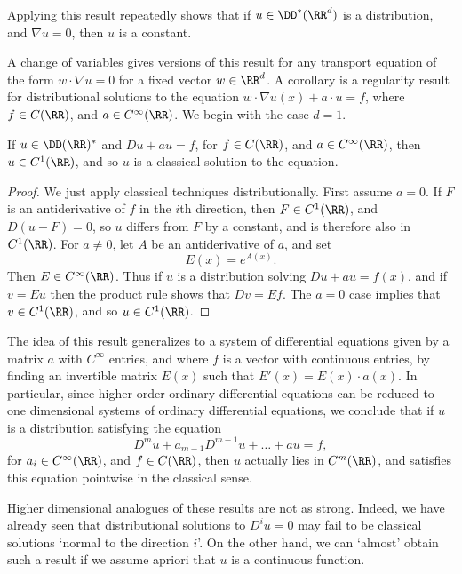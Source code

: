 \begin{remark}
    Applying this result repeatedly shows that if $u \in \DD^*(\RR^d)$ is a distribution, and $\nabla u = 0$, then $u$ is a constant.
\end{remark}

A change of variables gives versions of this result for any transport equation of the form $w \cdot \nabla u = 0$ for a fixed vector $w \in \RR^d$. A corollary is a regularity result for distributional solutions to the equation $w \cdot \nabla u(x) + a \cdot u = f$, where $f \in C(\RR)$, and $a \in C^\infty(\RR)$. We begin with the case $d = 1$.

\begin{lemma}
    If $u \in \DD(\RR)^*$ and $Du + au = f$, for $f \in C(\RR)$, and $a \in C^\infty(\RR)$, then $u \in C^1(\RR)$, and so $u$ is a classical solution to the equation.
\end{lemma}
\begin{proof}
    We just apply classical techniques distributionally. First assume $a = 0$. If $F$ is an antiderivative of $f$ in the $i$th direction, then $F \in C^1(\RR)$, and $D(u - F) = 0$, so $u$ differs from $F$ by a constant, and is therefore also in $C^1(\RR)$. For $a \neq 0$, let $A$ be an antiderivative of $a$, and set
    \[ E(x) = e^{A(x)}. \]
    Then $E \in C^\infty(\RR)$. Thus if $u$ is a distribution solving $D u + a u = f(x)$, and if $v = E u$ then the product rule shows that $Dv = Ef$. The $a = 0$ case implies that $v \in C^1(\RR)$, and so $u \in C^1(\RR)$.
\end{proof}

\begin{remark}
    The idea of this result generalizes to a system of differential equations given by a matrix $a$ with $C^\infty$ entries, and where $f$ is a vector with continuous entries, by finding an invertible matrix $E(x)$ such that $E'(x) = E(x) \cdot a(x)$. In particular, since higher order ordinary differential equations can be reduced to one dimensional systems of ordinary differential equations, we conclude that if $u$ is a distribution satisfying the equation
    \[ D^m u + a_{m-1} D^{m-1} u + \dots + au = f, \]
    for $a_i \in C^\infty(\RR)$, and $f \in C(\RR)$, then $u$ actually lies in $C^m(\RR)$, and satisfies this equation pointwise in the classical sense.
\end{remark}

Higher dimensional analogues of these results are not as strong. Indeed, we have already seen that distributional solutions to $D^i u = 0$ may fail to be classical solutions `normal to the direction $i$'. On the other hand, we can `almost' obtain such a result if we assume apriori that $u$ is a continuous function.

